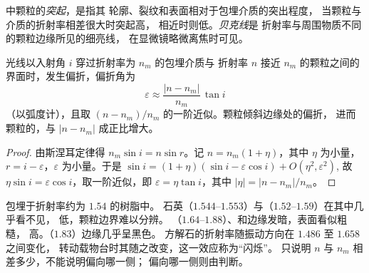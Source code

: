 \begin{definition}[突起、贝克线]\label{def:b1:optical-mineralogy:relief}
中颗粒的\emph{突起}，是指其
轮廓、裂纹和表面相对于包埋介质的突出程度，
当颗粒与介质的折射率相差很大时突起高，
相近时则低。\emph{贝克线}是
折射率与周围物质不同的颗粒边缘所见的细亮线，
在显微镜略微离焦时可见。
\end{definition}

\begin{proposition}[突起与折射率]\label{prop:b1:optical-mineralogy:relief}
光线以入射角 $i$ 穿过折射率为 $n_m$ 的包埋介质与
折射率 $n$ 接近 $n_m$ 的颗粒之间的界面时，发生偏折，偏折角为
\[
  \varepsilon \approx \frac{|n - n_m|}{n_m}\,\tan i
\]
（以弧度计），且取 $(n - n_m)/n_m$ 的一阶近似。颗粒倾斜边缘处的偏折，
进而颗粒的，与
$|n - n_m|$ 成正比增大。
\end{proposition}

\begin{proof}
由斯涅耳定律得 $n_m \sin i = n \sin r$。记 $n = n_m(1 + \eta)$，其中
$\eta$ 为小量，$r = i - \varepsilon$，$\varepsilon$ 为小量。于是
$\sin i = (1 + \eta)(\sin i - \varepsilon\cos i) + O(\eta^2, \varepsilon^2)$,
故 $\eta \sin i = \varepsilon\cos i$，取一阶近似，即
$\varepsilon = \eta\tan i$，其中 $|\eta| = |n - n_m|/n_m$。
\end{proof}

包埋于折射率约为 $1.54$ 的树脂中。
石英（$1.544$--$1.553$）与（$1.52$--$1.59$）在其中几乎看不见，
低，颗粒边界难以分辨。
（$1.64$--$1.88$）、和边缘发暗，表面看似粗糙，
高。（$1.83$）边缘几乎呈黑色。
方解石的折射率随振动方向在 $1.486$ 至 $1.658$ 之间变化，
转动载物台时其随之改变，这一效应称为“闪烁”。
只说明 $n$ 与 $n_m$ 相差多少，不能说明偏向哪一侧；
偏向哪一侧则由判断。

